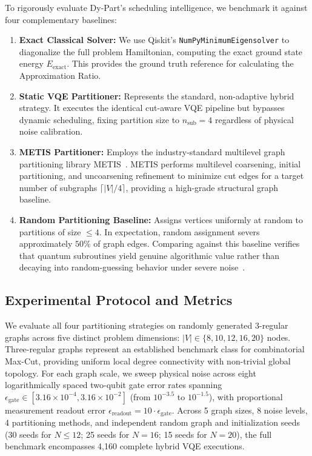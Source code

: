 \documentclass[pdflatex,sn-mathphys-num]{sn-jnl}
\theoremstyle{thmstyleone}
\theoremstyle{thmstyletwo}%
\theoremstyle{thmstylethree}%
\begin{document}
To rigorously evaluate Dy-Part's scheduling intelligence, we benchmark it against four complementary baselines:
\begin{enumerate}
    \item \textbf{Exact Classical Solver:} We use Qiskit's \texttt{NumPyMinimumEigensolver} to diagonalize the full problem Hamiltonian, computing the exact ground state energy $E_{\text{exact}}$. This provides the ground truth reference for calculating the Approximation Ratio.
    \item \textbf{Static VQE Partitioner:} Represents the standard, non-adaptive hybrid strategy. It executes the identical cut-aware VQE pipeline but bypasses dynamic scheduling, fixing partition size to $n_{\text{sub}} = 4$ regardless of physical noise calibration.
    \item \textbf{METIS Partitioner:} Employs the industry-standard multilevel graph partitioning library METIS~\cite{Karypis1998}. METIS performs multilevel coarsening, initial partitioning, and uncoarsening refinement to minimize cut edges for a target number of subgraphs $\lceil |V|/4 \rceil$, providing a high-grade structural graph baseline.
    \item \textbf{Random Partitioning Baseline:} Assigns vertices uniformly at random to partitions of size $\le 4$. In expectation, random assignment severs approximately $50\%$ of graph edges. Comparing against this baseline verifies that quantum subroutines yield genuine algorithmic value rather than decaying into random-guessing behavior under severe noise~\cite{Kim2020TowardsHCAA}.
\end{enumerate}

\subsection{Experimental Protocol and Metrics}

We evaluate all four partitioning strategies on randomly generated 3-regular graphs across five distinct problem dimensions: $|V| \in \{8, 10, 12, 16, 20\}$ nodes. Three-regular graphs represent an established benchmark class for combinatorial Max-Cut, providing uniform local degree connectivity with non-trivial global topology. For each graph scale, we sweep physical noise across eight logarithmically spaced two-qubit gate error rates spanning $\epsilon_{\text{gate}} \in [3.16 \times 10^{-4}, 3.16 \times 10^{-2}]$ (from $10^{-3.5}$ to $10^{-1.5}$), with proportional measurement readout error $\epsilon_{\text{readout}} = 10 \cdot \epsilon_{\text{gate}}$. Across 5 graph sizes, 8 noise levels, 4 partitioning methods, and independent random graph and initialization seeds (30 seeds for $N \le 12$; 25 seeds for $N = 16$; 15 seeds for $N = 20$), the full benchmark encompasses 4,160 complete hybrid VQE executions.
\end{document}

